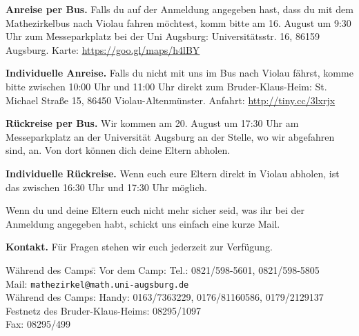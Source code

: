 \documentclass[12pt]{zettel}
\begin{document}
\begin{shaded}
\textbf{Anreise per Bus.} Falls du auf der Anmeldung angegeben hast, dass du mit dem
Mathezirkelbus nach Violau fahren möchtest, komm bitte am 16. August um
9:30 Uhr zum Messeparkplatz bei der Uni Augsburg: Universitätsstr. 16, 86159
Augsburg. Karte: \url{https://goo.gl/maps/h4lBY}

\textbf{Individuelle Anreise.} Falls du nicht mit uns im Bus nach Violau fährst, komme bitte
zwischen 10:00 Uhr und 11:00 Uhr direkt zum Bruder-Klaus-Heim:
St. Michael Straße 15, 86450 Violau-Altenmünster. Anfahrt:
\url{http://tiny.cc/3lxrjx}

\textbf{Rückreise per Bus.} Wir kommen am 20. August um 17:30 Uhr am Messeparkplatz an der Universität Augsburg an der Stelle, wo wir abgefahren sind, an. Von dort können dich deine Eltern abholen.

\textbf{Individuelle Rückreise.} Wenn euch eure Eltern direkt in Violau abholen, ist das zwischen 16:30 Uhr und 17:30 Uhr möglich.

Wenn du und deine Eltern euch nicht mehr sicher seid, was ihr bei der Anmeldung angegeben habt,
schickt uns einfach eine kurze Mail.
\end{shaded}


\begin{shaded}
\textbf{Kontakt.} Für Fragen stehen wir euch jederzeit zur Verfügung.
\begin{tabbing}
  Während des Camps:\quad \= \kill
  Vor dem Camp: \> Tel.: 0821/598-5601, 0821/598-5805 \\
  \> Mail: \texttt{mathezirkel@math.uni-augsburg.de} \\[0.5em]
  Während des Camps: \> Handy: 0163/7363229, 0176/81160586, 0179/2129137 \\
  \> Festnetz des Bruder-Klaus-Heims: 08295/1097 \\
  \> Fax: 08295/499
\end{tabbing}
\end{shaded}

\newpage
\end{document}
